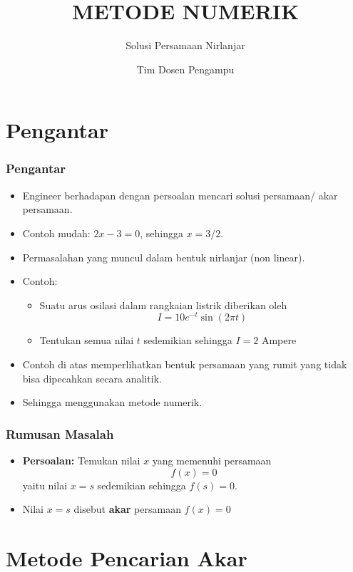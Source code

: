 \documentclass[pdflatex,compress]{beamer}
\title{METODE NUMERIK}
\subtitle{Solusi Persamaan Nirlanjar}
\author{Tim Dosen Pengampu}
\begin{document}
	
\maketitle

\section{Pengantar}

\begin{frame}
	\frametitle{Pengantar}
	\begin{itemize}
		\item Engineer berhadapan dengan persoalan mencari solusi persamaan/ akar persamaan.
		\item Contoh mudah: $ 2x - 3 = 0 $, sehingga $ x = 3/2 $.
		\item Permasalahan yang muncul dalam bentuk nirlanjar (non linear).
		\item Contoh:
		\begin{itemize}
			\item Suatu arus osilasi dalam rangkaian listrik diberikan oleh \[ I = 10 e^{-t} \sin(2\pi t) \]
			\item Tentukan semua nilai $ t $ sedemikian sehingga $ I = 2 $ Ampere 
		\end{itemize}
		\item Contoh di atas memperlihatkan bentuk persamaan yang rumit yang tidak bisa dipecahkan secara analitik.
		\item Sehingga menggunakan metode numerik.
	\end{itemize}
\end{frame}
\begin{frame}
	\frametitle{Rumusan Masalah}
	\begin{itemize}
		\item \textbf{Persoalan:} Temukan nilai $ x $ yang memenuhi persamaan
		\[f(x) = 0\]
		yaitu nilai $ x = s $ sedemikian sehingga $ f(s) = 0 $.
		\item Nilai $ x = s $ disebut \textbf{akar} persamaan $ f(x) = 0 $
	\end{itemize}
\end{frame}

\section{Metode Pencarian Akar}
\end{document}
